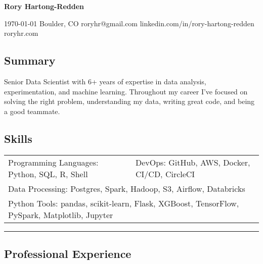 \documentclass[10pt,letterpaper]{article}
\newenvironment{indentsection}[1]
{\begin{list}{}%
	{\setlength{\leftmargin}{#1}}
	\item[]%
}
{\end{list}}
\begin{document}
{\raggedright \LARGE \bf Rory Hartong-Redden}

{\raggedleft 
\today \/ \textbar
\/ Boulder, CO \textbar
\/ roryhr@gmail.com \textbar
\/ linkedin.com/in/rory-hartong-redden \textbar
\/ roryhr.com
\\
}


\subsection*{Summary}
\begin{centering}
Senior Data Scientist with 6+ years of expertise in data analysis, experimentation, and machine learning.
Throughout my career I've focused on solving the right problem, understanding my data, writing great code, and being a good teammate.
\end{centering}

\subsection*{Skills}

\begin{indentsection}{\parindent}
\begin{tabular}{p{0.5\linewidth}   p{0.5\linewidth}} 
	Programming Languages: Python, SQL, R, Shell
	& DevOps: GitHub, AWS, Docker,  CI/CD, CircleCI \\

	\multicolumn{2}{l}{Data Processing: Postgres, Spark, Hadoop, S3, Airflow, Databricks} \\
	\multicolumn{2}{l}{
		Python Tools: pandas, scikit-learn, Flask, XGBoost, TensorFlow, PySpark, Matplotlib, Jupyter
		}
\end{tabular}
\end{indentsection}

\hrule
\subsection*{Professional Experience}
\end{document}
